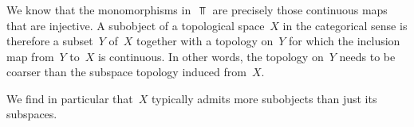 \subsubsection{}

We know that the monomorphisms in~$\Top$ are precisely those continuous maps that are injective.
A subobject of a topological space~$X$ in the categorical sense is therefore a subset~$Y$ of~$X$ together with a topology on~$Y$ for which the inclusion map from~$Y$ to~$X$ is continuous.
In other words, the topology on~$Y$ needs to be coarser than the subspace topology induced from~$X$.

We find in particular that~$X$ typically admits more subobjects than just its subspaces.
